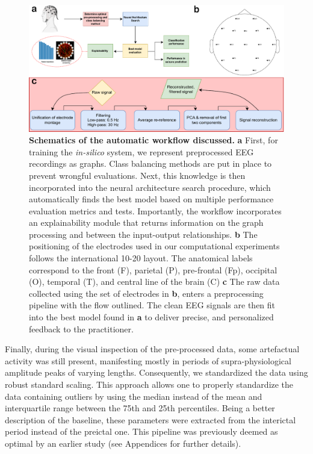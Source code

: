 \documentclass[a4paper,fleqn]{cas-sc}
\begin{document}
\begin{figure}
    \centering
    \includegraphics[width=\linewidth]{figures/Fig1.pdf}
    \caption{\textbf{Schematics of the automatic workflow discussed.} \textbf{a} First, for training the \textit{in-silico} system, we represent preprocessed EEG recordings as graphs. Class balancing methods are put in place to prevent wrongful evaluations. Next, this knowledge is then incorporated into the neural architecture search procedure, which automatically finds the best model based on multiple performance evaluation metrics and tests. Importantly, the workflow incorporates an explainability module that returns information on the graph processing and between the input-output relationships. \textbf{b} The positioning of the electrodes used in our computational experiments follows the international 10-20 layout. The anatomical labels correspond to the front (F), parietal (P), pre-frontal (Fp), occipital (O), temporal (T), and central line of the brain (C) \textbf{c} The raw data collected using the set of electrodes in \textbf{b}, enters a preprocessing pipeline with the flow outlined. The clean EEG signals are then fit into the best model found in \textbf{a} to deliver precise, and personalized feedback to the practitioner.}
    \label{fig:graphical_abstract}
\end{figure}

Finally, during the visual inspection of the pre-processed data, some artefactual activity was still present, manifesting mostly in periods of supra-physiological amplitude peaks of varying lengths. Consequently, we standardized the data using robust standard scaling. This approach allows one to properly standardize the data containing outliers by using the median instead of the mean and interquartile range between the 75th and 25th percentiles. Being a better description of the baseline, these parameters were extracted from the interictal period instead of the preictal one. This pipeline was previously deemed as optimal by an earlier study \cite{MazurekPreprocessing} (see Appendices for further details).
\end{document}
